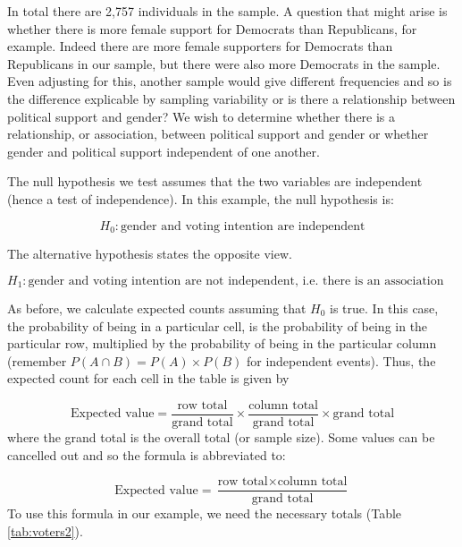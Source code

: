 \documentclass[
  oneside]{krantz}
\begin{document}
In total there are 2,757 individuals in the sample. A question that might arise is whether there is more female support for Democrats than Republicans, for example. Indeed there are more female supporters for Democrats than Republicans in our sample, but there were also more Democrats in the sample. Even adjusting for this, another sample would give different frequencies and so is the difference explicable by sampling variability or is there a relationship between political support and gender? We wish to determine whether there is a relationship, or association, between political support and gender or whether gender and political support independent of one another.

The null hypothesis we test assumes that the two variables are independent (hence a test of independence). In this example, the null hypothesis is:

\[H_0: \textrm{gender and voting intention are independent}\]

The alternative hypothesis states the opposite view.

\[H_1: \textrm{gender and voting intention are not independent, i.e. there is an association between gender and political support.}\]

As before, we calculate expected counts assuming that \(H_0\) is true. In this case, the probability of being in a particular cell, is the probability of being in the particular row, multiplied by the probability of being in the particular column (remember \(P(A \cap B) = P(A) \times P(B)\) for independent events). Thus, the expected count for each cell in the table is given by

\[\textrm{Expected value} =  \frac{\textrm{row total}}{\textrm{grand total}} \times \frac{\textrm{column total}}{\textrm{grand total}} \times \textrm{grand total}\]
where the grand total is the overall total (or sample size). Some values can be cancelled out and so the formula is abbreviated to:

\[\textrm{Expected value} =  \frac{\textrm{row total} \times \textrm{column total}}{\textrm{grand total}} \]
To use this formula in our example, we need the necessary totals (Table \ref{tab:voters2}).
\end{document}
